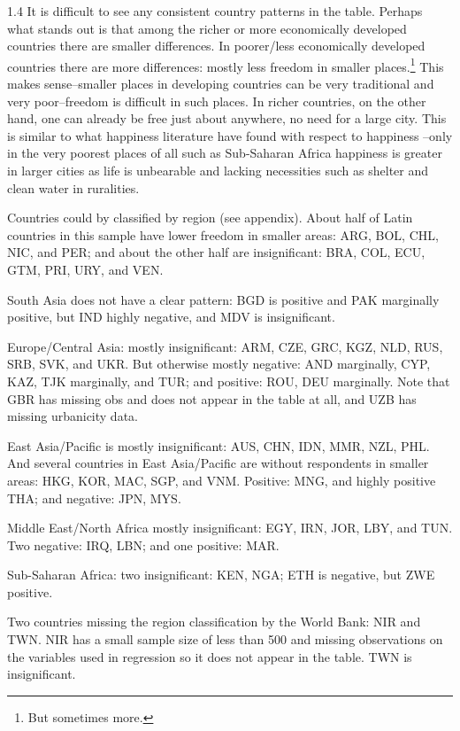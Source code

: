 \documentclass[10pt, letterpaper]{article}
\begin{document}
\begin{spacing}{1.4}
It is difficult to see any consistent country patterns in the table. Perhaps
what stands out is that among the richer or more economically developed
countries there are smaller differences.
In poorer/less economically
developed countries there are more differences: mostly less freedom in smaller
places.\footnote{But sometimes more.} This makes sense--smaller places in
developing countries can be very traditional and very poor--freedom is difficult
in such places. In richer countries, on the other hand, one can already be free
just about anywhere, no need for a large city. This is similar to what happiness
literature have found with respect to happiness \citep{aokCityBook15}--only in
the very poorest places of all such as Sub-Saharan Africa happiness is greater in
larger cities as life is unbearable and lacking necessities such as shelter and
clean water in ruralities.



Countries could by classified by region (see appendix).
About half of Latin countries in this sample have lower freedom in smaller areas: ARG, BOL, CHL, NIC, and
PER; and about the other half are insignificant: BRA, COL, ECU, GTM, PRI, URY, and VEN.
 
South Asia does not have a clear pattern: BGD is positive and PAK marginally positive, but IND highly
negative, and MDV is insignificant.
 
Europe/Central Asia: mostly insignificant: ARM, CZE, GRC, KGZ, NLD, RUS, SRB, SVK,
and UKR. But otherwise mostly negative: AND marginally, CYP, KAZ, TJK marginally, and TUR;
and positive: ROU, DEU marginally. Note that GBR has missing obs and does not
appear in the table at all, and UZB has missing urbanicity data. 

East Asia/Pacific is mostly insignificant: AUS, CHN, IDN, MMR, NZL, PHL.  
And several countries in East Asia/Pacific are without respondents in smaller
areas: HKG, KOR, MAC, SGP, and VNM.
Positive: MNG, and highly positive THA; 
and negative: JPN, MYS.

Middle East/North Africa mostly insignificant: EGY, IRN, JOR, LBY,  and TUN.  
 Two negative: IRQ, LBN; and one positive: MAR.

 Sub-Saharan Africa: two  insignificant: KEN, NGA; ETH is negative, but ZWE positive.

 Two countries missing the region classification by the World Bank: NIR and TWN.
 NIR has a small sample size of less than 500 and missing observations on the variables
 used in regression so it does not appear in the table. TWN is insignificant. 




\end{spacing}
\end{document}
